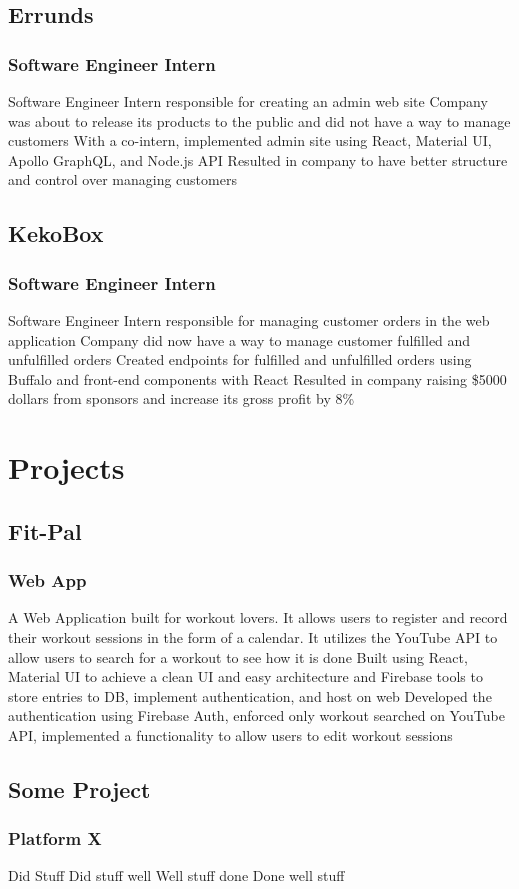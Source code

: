 \documentclass{article}
\begin{document}
\subsection{Errunds}
\subsubsection{Software Engineer Intern}
Software Engineer Intern responsible for creating an admin web site
Company was about to release its products to the public and did not have a way to manage customers
With a co-intern, implemented admin site using React, Material UI, Apollo GraphQL, and Node.js API
Resulted in company to have better structure and control over managing customers
\subsection{KekoBox}
\subsubsection{Software Engineer Intern}
Software Engineer Intern responsible for managing customer orders in the web application
Company did now have a way to manage customer fulfilled and unfulfilled orders
Created endpoints for fulfilled and unfulfilled orders using Buffalo and front-end components with React
Resulted in company raising \$5000 dollars from sponsors and increase its gross profit by 8\%
\section{Projects}
\subsection{Fit-Pal}
\subsubsection{Web App}
A Web Application built for workout lovers. It allows users to register and record their workout sessions in the form of a calendar. It utilizes the YouTube API to allow users to search for a workout to see how it is done
Built using React, Material UI to achieve a clean UI and easy architecture and Firebase tools to store entries to DB, implement authentication, and host on web
Developed the authentication using Firebase Auth, enforced only workout searched on YouTube API, implemented a functionality to allow users to edit workout sessions

\subsection{Some Project}
\subsubsection{Platform X}
Did Stuff
Did stuff well
Well stuff done
Done well stuff
\end{document}
